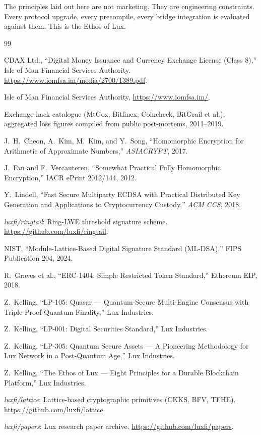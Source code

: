 \documentclass[11pt,a4paper]{article}
\begin{document}
The principles laid out here are not marketing. They are engineering
constraints. Every protocol upgrade, every precompile, every bridge
integration is evaluated against them. This is the Ethos of Lux.


\begin{thebibliography}{99}

CDAX Ltd., ``Digital Money Issuance and Currency Exchange License
(Class 8),'' Isle of Man Financial Services Authority.
\url{https://www.iomfsa.im/media/2700/1389.pdf}.

Isle of Man Financial Services Authority,
\url{https://www.iomfsa.im/}.

Exchange-hack catalogue (MtGox, Bitfinex, Coincheck, BitGrail et al.),
aggregated loss figures compiled from public post-mortems, 2011--2019.

J.~H.~Cheon, A.~Kim, M.~Kim, and Y.~Song, ``Homomorphic Encryption for
Arithmetic of Approximate Numbers,'' \textit{ASIACRYPT}, 2017.

J.~Fan and F.~Vercauteren, ``Somewhat Practical Fully Homomorphic
Encryption,'' IACR ePrint 2012/144, 2012.

Y.~Lindell, ``Fast Secure Multiparty ECDSA with Practical Distributed
Key Generation and Applications to Cryptocurrency Custody,''
\textit{ACM CCS}, 2018.

\textit{luxfi/ringtail}: Ring-LWE threshold signature scheme.
\url{https://github.com/luxfi/ringtail}.

NIST, ``Module-Lattice-Based Digital Signature Standard (ML-DSA),''
FIPS Publication 204, 2024.

R.~Graves et al., ``ERC-1404: Simple Restricted Token Standard,''
Ethereum EIP, 2018.

Z.~Kelling, ``LP-105: Quasar --- Quantum-Secure Multi-Engine Consensus
with Triple-Proof Quantum Finality,'' Lux Industries.

Z.~Kelling, ``LP-001: Digital Securities Standard,'' Lux Industries.

Z.~Kelling, ``LP-305: Quantum Secure Assets --- A Pioneering
Methodology for Lux Network in a Post-Quantum Age,'' Lux Industries.

Z.~Kelling, ``The Ethos of Lux --- Eight Principles for a Durable
Blockchain Platform,'' Lux Industries.

\textit{luxfi/lattice}: Lattice-based cryptographic primitives
(CKKS, BFV, TFHE). \url{https://github.com/luxfi/lattice}.

\textit{luxfi/papers}: Lux research paper archive.
\url{https://github.com/luxfi/papers}.

\end{thebibliography}
\end{document}
